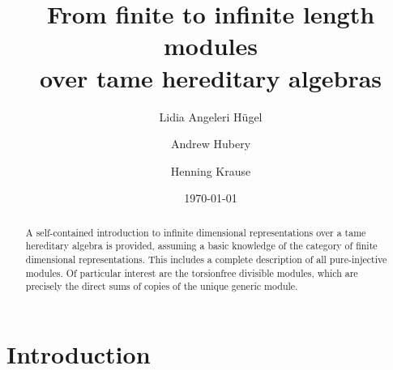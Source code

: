 \documentclass[a4paper]{amsart}
\title[Infinite length modules over tame hereditary algebras]{From finite to infinite length modules\\ over tame hereditary algebras}
\author{Lidia Angeleri H\"ugel}
\author{Andrew Hubery}
\author{Henning Krause}
\theoremstyle{plain}
\theoremstyle{definition}
\theoremstyle{remark}
\numberwithin{equation}{section}
\begin{document}
\date{\today}

\begin{abstract}
  A self-contained introduction to infinite dimensional
  representations over a tame hereditary algebra is provided, assuming
  a basic knowledge of the category of finite dimensional
  representations. This includes a complete description of all
  pure-injective modules.  Of particular interest are the torsionfree
  divisible modules, which are precisely the direct sums of copies of
  the unique generic module.
\end{abstract}




\maketitle 

\section{Introduction}
\end{document}
